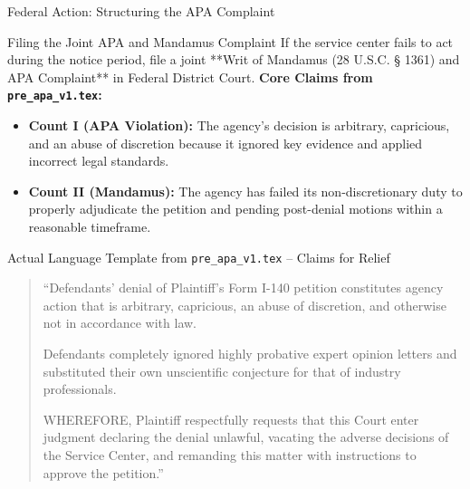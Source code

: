 \documentclass[11pt]{beamer}
\begin{document}
	\begin{frame}[allowframebreaks]{Federal Action: Structuring the APA Complaint}
		\scriptsize
		\begin{block}{Filing the Joint APA and Mandamus Complaint}
			If the service center fails to act during the notice period, file a joint **Writ of Mandamus (28 U.S.C. § 1361) and APA Complaint** in Federal District Court.
			\vspace{0.1cm}
			\textbf{Core Claims from \texttt{pre\_apa\_v1.tex}:}
			\begin{itemize}
				\item \textbf{Count I (APA Violation):} The agency’s decision is arbitrary, capricious, and an abuse of discretion because it ignored key evidence and applied incorrect legal standards.
				\item \textbf{Count II (Mandamus):} The agency has failed its non-discretionary duty to properly adjudicate the petition and pending post-denial motions within a reasonable timeframe.
			\end{itemize}
		\end{block}
		\framebreak
		\begin{block}{Actual Language Template from \texttt{pre\_apa\_v1.tex} -- Claims for Relief}
			\begin{quote}
				``Defendants’ denial of Plaintiff’s Form I-140 petition constitutes agency action that is arbitrary, capricious, an abuse of discretion, and otherwise not in accordance with law. 
				
				Defendants completely ignored highly probative expert opinion letters and substituted their own unscientific conjecture for that of industry professionals. 
				
				WHEREFORE, Plaintiff respectfully requests that this Court enter judgment declaring the denial unlawful, vacating the adverse decisions of the Service Center, and remanding this matter with instructions to approve the petition.''
			\end{quote}
		\end{block}
	\end{frame}
	
\end{document}
